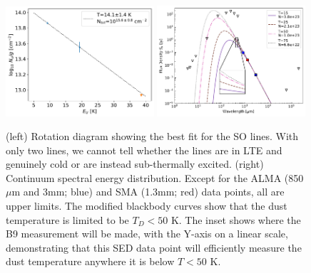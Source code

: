 \documentclass[12pt,a4paper]{article}  %
\begin{document}
\begin{figure}[htp]
    \centering
    \includegraphics[width=0.49\textwidth]{figures/LTE_rotationdiagram_fit.pdf}
    \includegraphics[width=0.49\textwidth]{figures/SED_with_planned_B9.pdf}
    \caption{(left) Rotation diagram showing the best fit for the SO lines.
    With only two lines, we cannot tell whether the lines are in LTE and genuinely cold or are instead sub-thermally excited.
    (right) Continuum spectral energy distribution. Except for the ALMA (850 $\mu$m and 3mm; blue) and SMA (1.3mm; red) data points, all are upper limits.  The modified blackbody curves show that the dust temperature is limited to be $T_D<50$ K.
    The inset shows where the B9 measurement will be made, with the Y-axis on a linear scale, demonstrating that this SED data point will efficiently measure the dust temperature anywhere it is below $T<50$ K.
    }
    \label{fig:LTErotationdiagram}
\end{figure}
\end{document}
